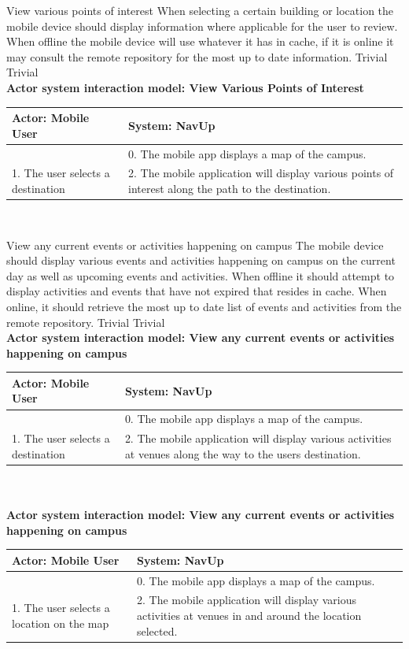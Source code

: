 \FuncReq
{View various points of interest}
{When selecting a certain building or location the mobile device should display information where applicable for the user to review. When offline the mobile device will use whatever it has in cache, if it is online it may consult the remote repository for the most up to date information.}
{Trivial}
{Trivial}
	\\
    \textbf{Actor system interaction model: View Various Points of Interest }\\
    \begin{tabular}{ | p{6cm} | p{6cm} |}
    \hline
    Actor: Mobile User & System: NavUp \\ \hline
    & 0. The mobile app displays a map of the campus.\\ \hline
    1. The user selects a destination & 2. The mobile application will display various points of interest along the path to the destination.\\ \hline
    \end{tabular}
\\
\bigskip

\FuncReq
{View any current events or activities happening on campus}
{The mobile device should display various events and activities happening on campus on the current day as well as upcoming events and activities. When offline it should attempt to display activities and events that have not expired that resides in cache. When online, it should retrieve the most up to date list of events and activities from the remote repository.}
{Trivial}
{Trivial}
	\\
    \textbf{Actor system interaction model: View any current events or activities happening on campus }\\
    \begin{tabular}{ | p{6cm} | p{6cm} |}
    \hline
    Actor: Mobile User & System: NavUp \\ \hline
    & 0. The mobile app displays a map of the campus.\\ \hline
    1. The user selects a destination & 2. The mobile application will display various activities at venues along the way to the users destination.
    \\ \hline
    \end{tabular}
\\
	\\
    \textbf{Actor system interaction model: View any current events or activities happening on campus }\\
    \begin{tabular}{ | p{6cm} | p{6cm} |}
    \hline
    Actor: Mobile User & System: NavUp \\ \hline
    & 0. The mobile app displays a map of the campus.\\ \hline
    1. The user selects a location on the map & 2. The mobile application will display various activities at venues in and around the location selected.\\ \hline
    \end{tabular}
\\
\bigskip


